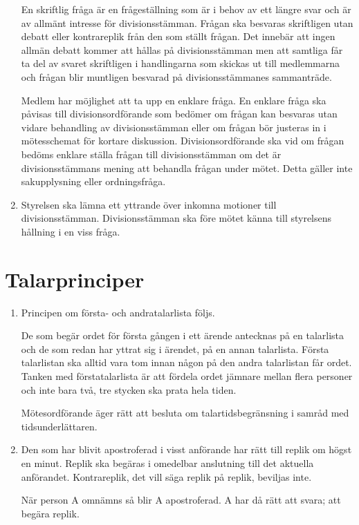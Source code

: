 \documentclass{dvd}
\begin{document}
\begin{enumerate}[label=\arabic* §, ref=\arabic*]
		En skriftlig fråga är en frågeställning som är i behov av ett längre svar och är av allmänt intresse för divisionsstämman.
		Frågan ska besvaras skriftligen utan debatt eller kontrareplik från den som ställt frågan.
		Det innebär att ingen allmän debatt kommer att hållas på divisionsstämman men att samtliga får ta del av svaret skriftligen i handlingarna som skickas ut till medlemmarna och frågan blir muntligen besvarad på divisionsstämmanes sammanträde.

		Medlem har möjlighet att ta upp en enklare fråga.
		En enklare fråga ska påvisas till divisionsordförande som bedömer om frågan kan besvaras utan vidare behandling av divisionsstämman eller om frågan bör justeras in i mötesschemat för kortare diskussion.
		Divisionsordförande ska vid om frågan bedöms enklare ställa frågan till divisionsstämman om det är divisionsstämmans mening att behandla frågan under mötet.
		Detta gäller inte sakupplysning eller ordningsfråga.

		\item Styrelsen ska lämna ett yttrande över inkomna motioner till divisionsstämman.
		Divisionsstämman ska före mötet känna till styrelsens hållning i en viss fråga.
	\end{enumerate}

	\section{Talarprinciper}

	\begin{enumerate}[label=\arabic* §, ref=\arabic*]
		\item Principen om första- och andratalarlista följs.

		De som begär ordet för första gången i ett ärende antecknas på en talarlista och de som redan har yttrat sig i ärendet, på en annan talarlista.
		Första talarlistan ska alltid vara tom innan någon på den andra talarlistan får ordet.
		Tanken med förstatalarlista är att fördela ordet jämnare mellan flera personer och inte bara två, tre stycken ska prata hela tiden.

		Mötesordförande äger rätt att besluta om talartidsbegränsning i samråd med tidsunderlättaren.

		\item Den som har blivit apostroferad i visst anförande har rätt till replik om högst en minut.
		Replik ska begäras i omedelbar anslutning till det aktuella anförandet.
		Kontrareplik, det vill säga replik på replik, beviljas inte.

		När person A omnämns så blir A apostroferad. A har då rätt att svara; att begära replik.
	\end{enumerate}
\end{document}
